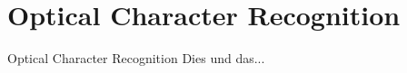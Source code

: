 \section{Optical Character Recognition}

\begin{frame}{Optical Character Recognition}
    Dies und das...
\end{frame}
